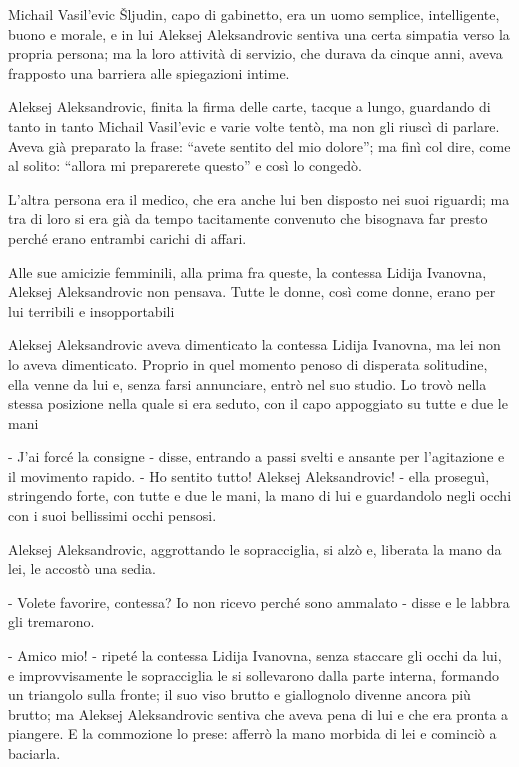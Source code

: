 Michail Vasil'evic Šljudin, capo di gabinetto, era un uomo semplice, intelligente, buono e morale, e in lui Aleksej Aleksandrovic sentiva una certa simpatia verso la propria persona; ma la loro attività di servizio, che durava da cinque anni, aveva frapposto una barriera alle spiegazioni intime. 

Aleksej Aleksandrovic, finita la firma delle carte, tacque a lungo, guardando di tanto in tanto Michail Vasil'evic e varie volte tentò, ma non gli riuscì di parlare. Aveva già preparato la frase: ``avete sentito del mio dolore''; ma finì col dire, come al solito: ``allora mi preparerete questo'' e così lo congedò. 

L'altra persona era il medico, che era anche lui ben disposto nei suoi riguardi; ma tra di loro si era già da tempo tacitamente convenuto che bisognava far presto perché erano entrambi carichi di affari. 

Alle sue amicizie femminili, alla prima fra queste, la contessa Lidija Ivanovna, Aleksej Aleksandrovic non pensava. Tutte le donne, così come donne, erano per lui terribili e insopportabili 

Aleksej Aleksandrovic aveva dimenticato la contessa Lidija Ivanovna, ma lei non lo aveva dimenticato. Proprio in quel momento penoso di disperata solitudine, ella venne da lui e, senza farsi annunciare, entrò nel suo studio. Lo trovò nella stessa posizione nella quale si era seduto, con il capo appoggiato su tutte e due le mani 

- J'ai forcé la consigne - disse, entrando a passi svelti e ansante per l'agitazione e il movimento rapido. - Ho sentito tutto! Aleksej Aleksandrovic! - ella proseguì, stringendo forte, con tutte e due le mani, la mano di lui e guardandolo negli occhi con i suoi bellissimi occhi pensosi. 

Aleksej Aleksandrovic, aggrottando le sopracciglia, si alzò e, liberata la mano da lei, le accostò una sedia. 

- Volete favorire, contessa? Io non ricevo perché sono ammalato - disse e le labbra gli tremarono. 

- Amico mio! - ripeté la contessa Lidija Ivanovna, senza staccare gli occhi da lui, e improvvisamente le sopracciglia le si sollevarono dalla parte interna, formando un triangolo sulla fronte; il suo viso brutto e giallognolo divenne ancora più brutto; ma Aleksej Aleksandrovic sentiva che aveva pena di lui e che era pronta a piangere. E la commozione lo prese: afferrò la mano morbida di lei e cominciò a baciarla. 

